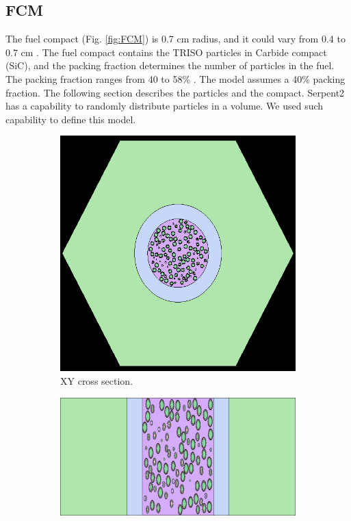 \documentclass[11pt,letterpaper]{article}
\begin{document}
\subsection{FCM}

The fuel compact (Fig. \ref{fig:FCM}) is 0.7 cm radius, and it could vary from 0.4 to 0.7 cm \cite{powers_fully_2013}. The fuel compact contains the TRISO particles in Carbide compact (SiC), and the packing fraction determines the number of particles in the fuel. The packing fraction ranges from 40 to 58\% \cite{powers_fully_2013}. The model assumes a 40\% packing fraction. The following section describes the particles and the compact.
Serpent2 has a capability to randomly distribute particles in a volume. We used such capability to define this model.

\begin{figure}[H]
	\centering
	\begin{subfigure}[t]{0.4\textwidth}
		\centering
		\includegraphics[width=\linewidth]{figures/FCM_geom1.png} 
		\caption{XY cross section.}
		\label{fig:FCM_xy}
	\end{subfigure}
	\begin{subfigure}[t]{0.4\textwidth}
		\centering
		\includegraphics[width=\linewidth]{figures/FCM_geom2.png}

\end{subfigure}
\end{figure}
\end{document}
